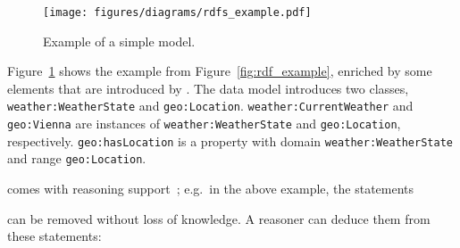 \begin{figure}
\centering
\texttt{[image: figures/diagrams/rdfs\_example.pdf]}
\caption[Example of a simple  model]{Example of a simple  model.}
\label{fig:rdfs_example}
\end{figure}

Figure~\ref{fig:rdfs_example} shows the example from Figure~\ref{fig:rdf_example}, enriched by some elements that are introduced by . The data model introduces two classes, \texttt{weather:\hspace{0pt}Weather\hspace{0pt}State} and \texttt{geo:\hspace{0pt}Location}. \texttt{weather:\hspace{0pt}CurrentWeather} and \texttt{geo:\hspace{0pt}Vienna} are instances of \texttt{weather:\hspace{0pt}Weather\hspace{0pt}State} and \texttt{geo:\hspace{0pt}Location}, respectively. \texttt{geo:\hspace{0pt}has\hspace{0pt}Location} is a property with domain \texttt{weather:\hspace{0pt}Weather\hspace{0pt}State} and range \texttt{geo:\hspace{0pt}Location}.

 comes with reasoning support~\cite{RDF_semantics}; e.g.\ in the above example, the statements

\noindent{}

can be removed without loss of knowledge. A reasoner can deduce them from these statements:

